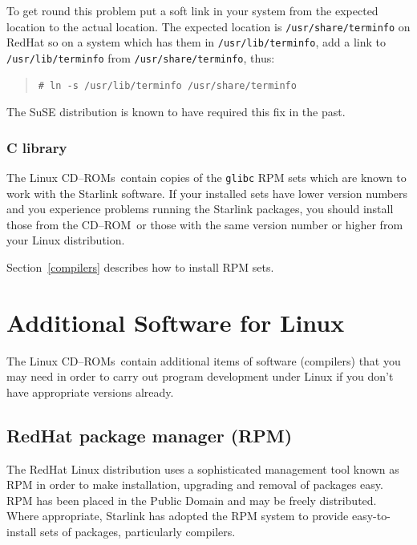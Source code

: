 \documentclass[twoside,11pt]{article}
\newcommand{\xlabel}[1]{}
\renewcommand{\_}{\texttt{\symbol{95}}}
\newcommand{\cdrom}{CD--ROM}
\newcommand{\cdrom}{CD-ROM}
\newcommand{\cdroms}{CD--ROMs}
\newcommand{\cdroms}{CD-ROMs}
\begin{document}
To get round this problem put a soft link in your system from the
expected location to the actual location.  The expected location is
\texttt{/usr/share/terminfo} on RedHat so on a system which has them
in \texttt{/usr/lib/terminfo}, add a link to \texttt{/usr/lib/terminfo}
from \texttt{/usr/share/terminfo}, thus:

\begin{quote}
\begin{verbatim}
# ln -s /usr/lib/terminfo /usr/share/terminfo
\end{verbatim}
\end{quote}

The SuSE distribution is known to have required this fix in the past.

\subsubsection{C library}

The Linux \cdroms\ contain copies of the \texttt{glibc} RPM sets
which are known to work with the Starlink software.  If your installed
sets have lower version numbers and you experience problems running the
Starlink packages, you should install those from the \cdrom\ or those
with the same version number or higher from your Linux distribution.

Section~\ref{compilers} describes how to install RPM sets.

\newpage
\section{\xlabel{additional_software_for_linux}Additional Software for Linux}
\label{additional_software_for_linux}

The Linux \cdroms\ contain additional items of software
(compilers) that you may need in order to carry out program
development under Linux if you don't have appropriate versions
already.

\subsection{\label{rpm}\xlabel{rpm}RedHat package manager (RPM)}

The RedHat Linux distribution uses a sophisticated management tool
known as RPM in order to make installation, upgrading and removal of
packages easy.  RPM has been placed in the Public Domain and may be freely
distributed.  Where appropriate, Starlink has adopted the RPM system
to provide easy-to-install sets of packages, particularly compilers.
\end{document}
